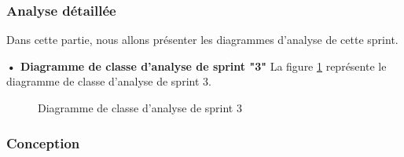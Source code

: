 \subsubsection{Analyse détaillée}
Dans cette partie, nous allons présenter les diagrammes d'analyse de cette sprint.

\textbf{•	Diagramme de classe d'analyse de sprint "3" }
La figure \ref{fig:class_analyse_signatures3} représente le diagramme de classe d'analyse de sprint 3.
\begin{figure}[H]
  \centering
  \caption{Diagramme de classe d'analyse de sprint 3}
  \label{fig:class_analyse_signatures3}
\end{figure}


\subsubsection{Conception}

